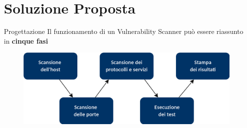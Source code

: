 \section{Soluzione Proposta}

\begin{frame}{Progettazione}
Il funzionamento di un Vulnerability Scanner può essere riassunto in \textbf{cinque fasi}
\vspace{0.2cm}
\begin{figure}
    \centering
    \includegraphics[width=12cm]{assets/mio/Fasi_scan.png}
\end{figure}
\end{frame}




